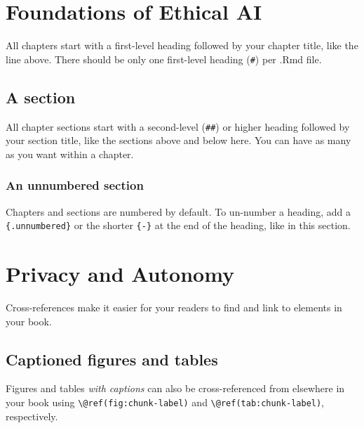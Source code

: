 \documentclass[
]{book}
\theoremstyle{definition}
\theoremstyle{definition}
\theoremstyle{definition}
\theoremstyle{definition}
\theoremstyle{remark}
\begin{document}
\hypertarget{ch-foundations}{%
\chapter{Foundations of Ethical AI}\label{ch-foundations}}

All chapters start with a first-level heading followed by your chapter title, like the line above. There should be only one first-level heading (\texttt{\#}) per .Rmd file.

\hypertarget{a-section}{%
\section{A section}\label{a-section}}

All chapter sections start with a second-level (\texttt{\#\#}) or higher heading followed by your section title, like the sections above and below here. You can have as many as you want within a chapter.

\hypertarget{an-unnumbered-section}{%
\subsection*{An unnumbered section}\label{an-unnumbered-section}}

Chapters and sections are numbered by default. To un-number a heading, add a \texttt{\{.unnumbered\}} or the shorter \texttt{\{-\}} at the end of the heading, like in this section.

\hypertarget{ch-privacy-and-autonomy}{%
\chapter{Privacy and Autonomy}\label{ch-privacy-and-autonomy}}

Cross-references make it easier for your readers to find and link to elements in your book.

\hypertarget{captioned-figures-and-tables}{%
\section{Captioned figures and tables}\label{captioned-figures-and-tables}}

Figures and tables \emph{with captions} can also be cross-referenced from elsewhere in your book using \texttt{\textbackslash{}@ref(fig:chunk-label)} and \texttt{\textbackslash{}@ref(tab:chunk-label)}, respectively.
\end{document}
